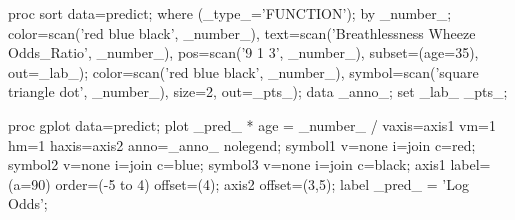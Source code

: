 \begin{listing}
proc sort data=predict;
   where (_type_='FUNCTION');
   by _number_;
   color=scan('red blue black', _number_),
   text=scan('Breathlessness Wheeze Odds_Ratio', _number_),
   pos=scan('9 1 3', _number_), subset=(age=35), out=_lab_);
   color=scan('red blue black', _number_),
   symbol=scan('square triangle dot', _number_), size=2, out=_pts_);
data _anno_;
   set _lab_ _pts_;

proc gplot data=predict;
   plot  _pred_ * age = _number_ /
        vaxis=axis1 vm=1 hm=1 haxis=axis2 anno=_anno_ nolegend;
   symbol1 v=none i=join c=red;
   symbol2 v=none i=join c=blue;
   symbol3 v=none i=join c=black;
   axis1 label=(a=90) order=(-5 to 4) offset=(4);
   axis2 offset=(3,5);
   label _pred_ = 'Log Odds';
\end{listing}
